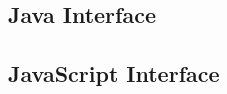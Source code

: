 \documentclass{book}
\begin{document}
\begin{jcpdflib}
\clearpage
\section*{Java Interface}
\begin{small}\tt

\end{small}
\end{jcpdflib}

\begin{jscpdflib}
\clearpage
\section*{JavaScript Interface}
\begin{small}\tt

\end{small}
\end{jscpdflib}
\end{document}
